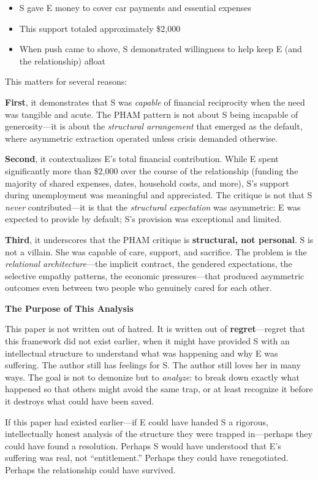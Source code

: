 \documentclass[12pt,openany]{book}
\numberwithin{equation}{chapter}
\begin{document}
\begin{itemize}
    \item S gave E money to cover car payments and essential expenses
    \item This support totaled approximately \$2,000
    \item When push came to shove, S demonstrated willingness to help keep E (and the relationship) afloat
\end{itemize}

This matters for several reasons:

\textbf{First}, it demonstrates that S was \textit{capable} of financial reciprocity when the need was tangible and acute. The PHAM pattern is not about S being incapable of generosity---it is about the \textit{structural arrangement} that emerged as the default, where asymmetric extraction operated unless crisis demanded otherwise.

\textbf{Second}, it contextualizes E's total financial contribution. While E spent significantly more than \$2,000 over the course of the relationship (funding the majority of shared expenses, dates, household costs, and more), S's support during unemployment was meaningful and appreciated. The critique is not that S \textit{never} contributed---it is that the \textit{structural expectation} was asymmetric: E was expected to provide by default; S's provision was exceptional and limited.

\textbf{Third}, it underscores that the PHAM critique is \textbf{structural, not personal}. S is not a villain. She was capable of care, support, and sacrifice. The problem is the \textit{relational architecture}---the implicit contract, the gendered expectations, the selective empathy patterns, the economic pressures---that produced asymmetric outcomes even between two people who genuinely cared for each other.

\textbf{The Purpose of This Analysis}

This paper is not written out of hatred. It is written out of \textbf{regret}---regret that this framework did not exist earlier, when it might have provided S with an intellectual structure to understand what was happening and why E was suffering. The author still has feelings for S. The author still loves her in many ways. The goal is not to demonize but to \textit{analyze}: to break down exactly what happened so that others might avoid the same trap, or at least recognize it before it destroys what could have been saved.

If this paper had existed earlier---if E could have handed S a rigorous, intellectually honest analysis of the structure they were trapped in---perhaps they could have found a resolution. Perhaps S would have understood that E's suffering was real, not ``entitlement.'' Perhaps they could have renegotiated. Perhaps the relationship could have survived.
\end{document}
